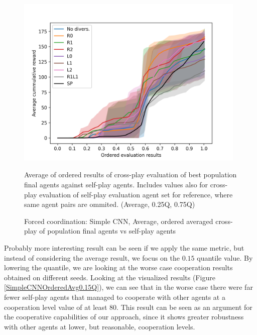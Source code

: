 \begin{figure}[!ht]
    \centering
    \includegraphics*[width=11cm]{../img/SimpleCNNOrderedAvg.png}

    \caption{Forced coordination: Simple CNN, Average, ordered averaged cross-play of population final agents vs self-play agents}
    \label{SimpleCNNOrderedAvg}
    \medskip
    \small 
    Average of ordered results of cross-play evaluation of best population final agents against self-play agents.
    Includes values also for cross-play evaluation of self-play evaluation agent set for reference, where same agent pairs are ommited.
    (Average, 0.25Q, 0.75Q)

\end{figure}

Probably more interesting result can be seen if we apply the same metric, but instead of considering the average result, we focus on the $0.15$ quantile value.
By lowering the quantile, we are looking at the worse case cooperation results obtained on different seeds.
Looking at the visualized results (Figure \ref{SimpleCNNOrderedAvg0.15Q}), we can see that in the worse case there were far fewer self-play agents that managed to cooperate with other agents at a cooperation level value of at least 80.
This result can be seen as an argument for the cooperative capabilities of our approach, since it shows greater robustness with other agents at lower, but reasonable, cooperation levels.



